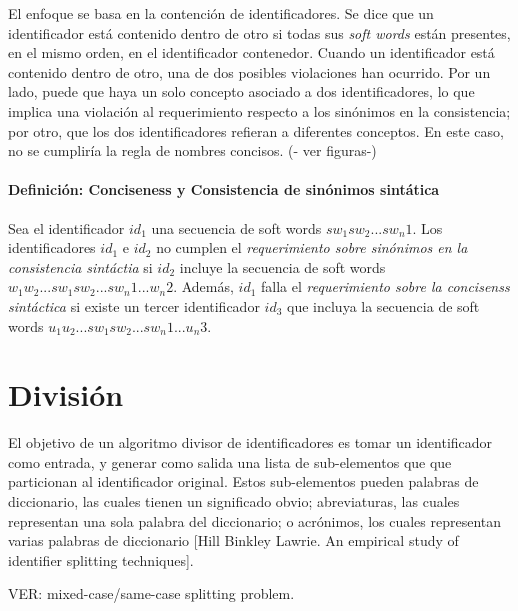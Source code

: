 El enfoque se basa en la contención de identificadores. Se dice que un identificador está contenido dentro de otro si todas sus \textit{soft words} están presentes, en el mismo orden, en el identificador contenedor. Cuando un identificador está contenido dentro de otro, una de dos posibles violaciones han ocurrido. Por un lado, puede que haya un solo concepto asociado a dos identificadores, lo que implica una violación al requerimiento respecto a los sinónimos en la consistencia; por otro, que los dos identificadores refieran a diferentes conceptos. En este caso, no se cumpliría la regla de nombres concisos. (- ver figuras-)

\paragraph{Definición: Conciseness y Consistencia de sinónimos sintática}
Sea el identificador $id_1$ una secuencia de soft words $sw_1 sw_2 ... sw_n1$. Los identificadores $id_1$ e $id_2$ no cumplen el \textit{requerimiento sobre sinónimos en la consistencia sintáctia} si $id_2$ incluye la secuencia de soft words $w_1 w_2 ... sw_1 sw_2 ... sw_n1 ... w_n2$. Además, $id_1$ falla el \textit{requerimiento sobre la concisenss sintáctica} si existe un tercer identificador $id_3$ que incluya la secuencia de soft words $u_1 u_2 ... sw_1 sw_2 ... sw_n1 ... u_n3$.

\section{División}
El objetivo de un algoritmo divisor de identificadores es tomar un identificador como entrada, y generar como salida
 una lista de sub-elementos que que particionan al identificador original. Estos sub-elementos pueden palabras de diccionario, las cuales tienen un significado obvio; abreviaturas, las cuales representan una sola palabra del diccionario; o acrónimos, los cuales representan varias palabras de diccionario [Hill Binkley Lawrie. An empirical study of identifier splitting techniques].

VER: mixed-case/same-case splitting problem.

